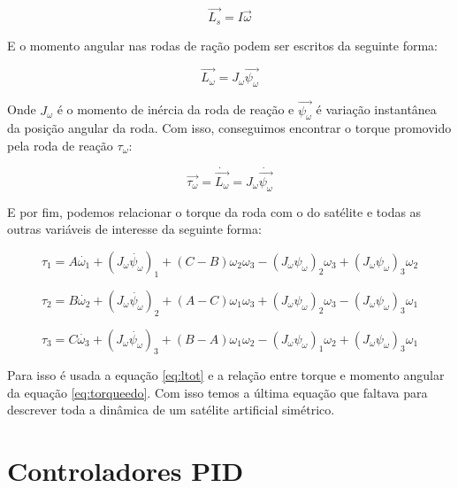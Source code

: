 \begin{equation}
\vec{L_s}=I\vec{\omega}
\end{equation}

E o momento angular nas rodas de ração podem ser escritos da seguinte forma:

\begin{equation}
\vec {L_{\omega} } =J_{\omega}\vec{\psi_{\omega}} 
\end{equation}

Onde $J_{\omega}$ é o momento de inércia da roda de reação e $\vec{\psi_{\omega}}$ é variação instantânea da posição angular da roda. Com isso, conseguimos encontrar o torque promovido pela roda de reação $\tau_{\omega}$:

\begin{equation}\label{eq:torqueedo}
\vec{\tau_{\omega}}=\dot{\vec{L_{\omega}}}=J_{\omega}\dot{\vec{\psi_{\omega}}}
\end{equation}

E por fim, podemos relacionar o torque da roda com o do satélite e todas as outras variáveis de interesse da seguinte forma:

\begin{equation}\label{eq:torquefinal1}
\tau_{1}=A\dot{\omega_{1}}+(J_{\omega}\dot{\psi_{\omega}})_{1}+(C-B)\omega_{2}\omega_{3}-(J_{\omega}\psi_{\omega})_{2}\omega_{3}+(J_{\omega}\psi_{\omega})_{3}\omega_{2}
\end{equation}

\begin{equation}\label{eq:torquefinal2}
\tau_{2}=B\dot{\omega_{2}}+(J_{\omega}\dot{\psi_{\omega}})_{2}+(A-C)\omega_{1}\omega_{3}+(J_{\omega}\psi_{\omega})_{2}\omega_{3}-(J_{\omega}\psi_{\omega})_{3}\omega_{1}
\end{equation}

\begin{equation}\label{eq:torquefinal3}
\tau_{3}=C\dot{\omega_{3}}+(J_{\omega}\dot{\psi_{\omega}})_{3}+(B-A)\omega_{1}\omega_{2}-(J_{\omega}\psi_{\omega})_{1}\omega_{2}+(J_{\omega}\psi_{\omega})_{3}\omega_{1}
\end{equation}

Para isso é usada a equação \ref{eq:ltot} e a relação entre torque e momento angular da equação \ref{eq:torqueedo}. Com isso temos a última equação que faltava para descrever toda a dinâmica de um satélite artificial simétrico. 



\section{Controladores PID}

